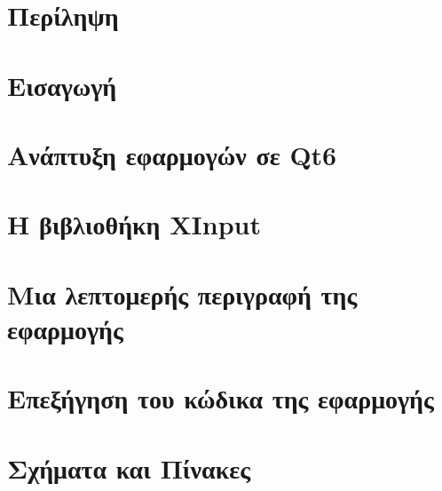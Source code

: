 \documentclass[a4paper,11pt,oneside,openany]{ioniothesis}
\begin{document}
\chapter*{Περίληψη} \pagestyle{headings}



\cleardoublepage

%


\cleardoublepage

\tableofcontents
\cleardoublepage




\listoffigures
\cleardoublepage
\listoftables

\setlength{\parskip}{5pt}



\pagestyle{headings}
\cleardoublepage


\newpage
{}


\cleardoublepage


\chapter{Εισαγωγή} \label{chapter:intro}


\chapter{Ανάπτυξη εφαρμογών σε Qt6} \label{chapter:qt6}


\chapter{Η βιβλιοθήκη XInput} \label{chapter:xinput}


\chapter{Μια λεπτομερής περιγραφή της εφαρμογής} \label{chapter:app}



\chapter{Επεξήγηση του κώδικα της εφαρμογής} \label{chapter:app}



\chapter{Σχήματα και Πίνακες} \label{chapter:sximata}

\end{document}

